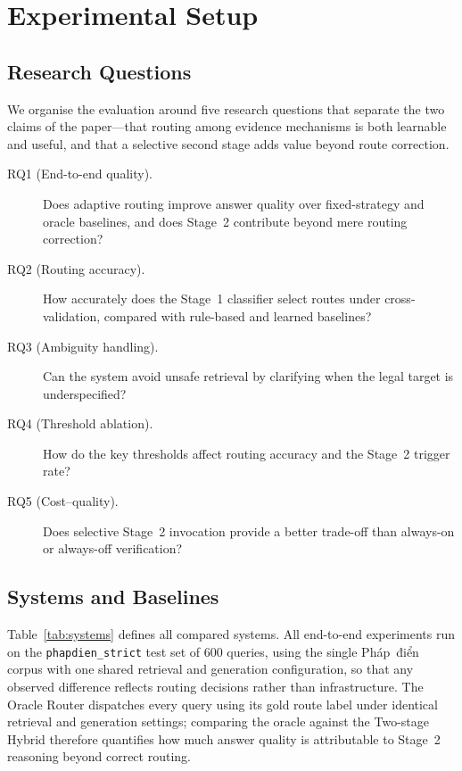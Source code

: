 \section{Experimental Setup}\label{sec:eval}

\subsection{Research Questions}\label{subsec:rqs}

We organise the evaluation around five research questions that separate the
two claims of the paper---that routing among evidence mechanisms is both
learnable and useful, and that a selective second stage adds value beyond
route correction.

\begin{description}
\item[RQ1 (End-to-end quality).] Does adaptive routing improve answer quality
over fixed-strategy and oracle baselines, and does Stage~2 contribute beyond
mere routing correction?
\item[RQ2 (Routing accuracy).] How accurately does the Stage~1 classifier
select routes under cross-validation, compared with rule-based and learned
baselines?
\item[RQ3 (Ambiguity handling).] Can the system avoid unsafe retrieval by
clarifying when the legal target is underspecified?
\item[RQ4 (Threshold ablation).] How do the key thresholds affect routing
accuracy and the Stage~2 trigger rate?
\item[RQ5 (Cost--quality).] Does selective Stage~2 invocation provide a better
trade-off than always-on or always-off verification?
\end{description}

\subsection{Systems and Baselines}\label{subsec:systems}

Table~\ref{tab:systems} defines all compared systems. All end-to-end
experiments run on the \texttt{phapdien\_strict} test set of $600$ queries,
using the single Pháp~điển corpus with one shared retrieval and generation
configuration, so that any observed difference reflects routing decisions
rather than infrastructure. The Oracle Router dispatches every query using its
gold route label under identical retrieval and generation settings; comparing
the oracle against the Two-stage Hybrid therefore quantifies how much answer
quality is attributable to Stage~2 reasoning beyond correct routing.

